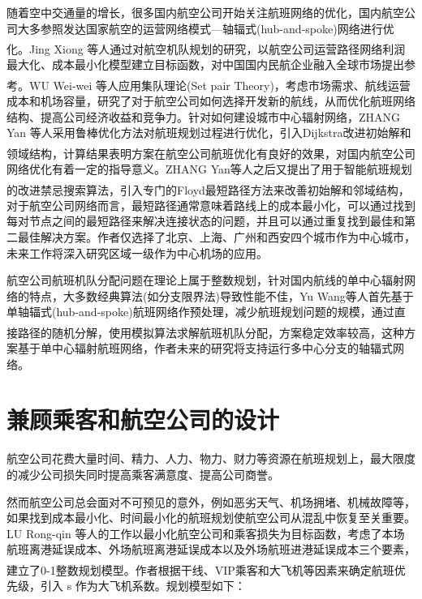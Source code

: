 \documentclass[runningheads]{llncs}
\newcommand{\upcite}[1]{\textsuperscript{\textsuperscript{\cite{#1}}}}
\begin{document}
随着空中交通量的增长，很多国内航空公司开始关注航班网络的优化，国内航空公司大多参照发达国家航空的运营网络模式---轴辐式(hub-and-spoke)网络进行优化。Jing Xiong 等人通过对航空机队规划的研究\upcite{ref_article14}，以航空公司运营路径网络利润最大化、成本最小化模型建立目标函数，对中国国内民航企业融入全球市场提出参考。WU Wei-wei 等人应用集队理论(Set pair Theory)\upcite{ref_article25}，考虑市场需求、航线运营成本和机场容量，研究了对于航空公司如何选择开发新的航线，从而优化航班网络结构、提高公司经济收益和竞争力。针对如何建设城市中心辐射网络，ZHANG Yan 等人采用鲁棒优化方法对航班规划过程进行优化，引入Dijkstra改进初始解和领域结构\upcite{ref_article12}，计算结果表明方案在航空公司航班优化有良好的效果，对国内航空公司网络优化有着一定的指导意义。ZHANG Yan等人之后又提出了用于智能航班规划的改进禁忌搜索算法\upcite{ref_article11}，引入专门的Floyd最短路径方法来改善初始解和邻域结构，对于航空公司网络而言，最短路径通常意味着路线上的成本最小化，可以通过找到每对节点之间的最短路径来解决连接状态的问题，并且可以通过重复找到最佳和第二最佳解决方案。作者仅选择了北京、上海、广州和西安四个城市作为中心城市，未来工作将深入研究区域一级作为中心机场的应用。

航空公司航班机队分配问题在理论上属于整数规划，针对国内航线的单中心辐射网络的特点，大多数经典算法(如分支限界法)导致性能不佳，Yu Wang等人首先基于单轴辐式(hub-and-spoke)航班网络作预处理，减少航班规划问题的规模，通过直接路径的随机分解，使用模拟算法求解航班机队分配\upcite{ref_article13}，方案稳定效率较高，这种方案基于单中心辐射航班网络，作者未来的研究将支持运行多中心分支的轴辐式网络。


\section{兼顾乘客和航空公司的设计}
航空公司花费大量时间、精力、人力、物力、财力等资源在航班规划上，最大限度的减少公司损失同时提高乘客满意度、提高公司商誉。

然而航空公司总会面对不可预见的意外，例如恶劣天气、机场拥堵、机械故障等，如果找到成本最小化、时间最小化的航班规划使航空公司从混乱中恢复至关重要。LU Rong-qin 等人的工作以最小化航空公司和乘客损失为目标函数，考虑了本场航班离港延误成本、外场航班离港延误成本以及外场航班进港延误成本三个要素，建立了0-1整数规划模型\upcite{ref_article5}。作者根据干线、VIP乘客和大飞机等因素来确定航班优先级，引入 s 作为大飞机系数。规划模型如下：
\end{document}

